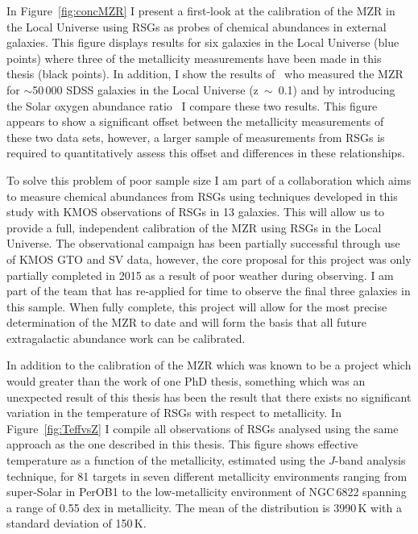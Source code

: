 In Figure~\ref{fig:concMZR} I present a first-look at the calibration of the MZR in the Local Universe using RSGs as probes of chemical abundances in external galaxies.
This figure displays results for six galaxies in the Local Universe (blue points) where three of the metallicity measurements have been made in this thesis (black points).
In addition, I show the results of~\cite{Tremonti04} who measured the MZR for $\sim$50\,000 SDSS galaxies in the Local Universe (z~$\sim$~0.1) and by introducing the Solar oxygen abundance ratio~\citep[12 + $\log$ (0/H)$_{\odot}$~=~8.69][]{2009ARA&A..47..481A} I compare these two results.
This figure appears to show a significant offset between the metallicity measurements of these two data sets, however, a larger sample of measurements from RSGs is required to quantitatively assess this offset and differences in these relationships.


To solve this problem of poor sample size I am part of a collaboration which aims to measure chemical abundances from RSGs using techniques developed in this study with KMOS observations of RSGs in 13 galaxies.
This will allow us to provide a full, independent calibration of the MZR using RSGs in the Local Universe.
The observational campaign has been partially successful through use of KMOS GTO and SV data, however, the core proposal for this project was only partially completed in 2015 as a result of poor weather during observing.
I am part of the team that has re-applied for time to observe the final three galaxies in this sample.
When fully complete, this project will allow for the most precise determination of the MZR to date and will form the basis that all future extragalactic abundance work can be calibrated.


In addition to the calibration of the MZR which was known to be a project which would greater than the work of one PhD thesis, something which was an unexpected result of this thesis has been the result that there exists no significant variation in the temperature of RSGs with respect to metallicity.
In Figure~\ref{fig:TeffvsZ} I compile all observations of RSGs analysed using the same approach as the one described in this thesis.
This figure shows effective temperature as a function of the metallicity, estimated using the $J$-band analysis technique, for 81 targets in seven different metallicity environments ranging from super-Solar in PerOB1 to the low-metallicity environment of NGC\,6822 spanning a range of 0.55 dex in metallicity.
The mean of the distribution is 3990\,K with a standard deviation of 150\,K.


